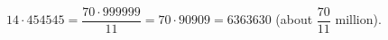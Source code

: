 $14\cdot454545=\dfrac{70\cdot999999}{11}=70\cdot90909=\boxed{6363630}$ (about $\dfrac{70}{11}$ million).
